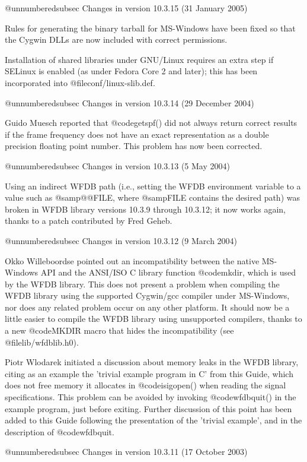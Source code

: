 {{{{{{{{@unnumberedsubsec Changes in version 10.3.15 (31 January 2005)

Rules for generating the binary tarball for MS-Windows have been
fixed so that the Cygwin DLLs are now included with correct
permissions.

Installation of shared libraries under GNU/Linux requires an extra
step if SELinux is enabled (as under Fedora Core 2 and later);  this
has been incorporated into @file{conf/linux-slib.def}.

@unnumberedsubsec Changes in version 10.3.14 (29 December 2004)

Guido Muesch reported that @code{getspf()} did not always
return correct results if the frame frequency does not have an exact
representation as a double precision floating point number.  This problem has
now been corrected.

@unnumberedsubsec Changes in version 10.3.13 (5 May 2004)

Using an indirect WFDB path (i.e., setting the WFDB environment
variable to a value such as @samp{@@FILE}, where @samp{FILE} contains the
desired path) was broken in WFDB library versions 10.3.9 through
10.3.12;  it now works again, thanks to a patch contributed by
Fred Geheb.

@unnumberedsubsec Changes in version 10.3.12 (9 March 2004)

Okko Willeboordse pointed out an incompatibility between the native
MS-Windows API and the ANSI/ISO C library function @code{mkdir}, which is
used by the WFDB library.  This does not present a problem when
compiling the WFDB library using the supported Cygwin/gcc compiler
under MS-Windows, nor does any related problem occur on any other
platform.  It should now be a little easier to compile the WFDB library
using unsupported compilers, thanks to a new @code{MKDIR} macro that hides
the incompatibility (see @file{lib/wfdblib.h0}).

Piotr Wlodarek initiated a discussion about memory leaks in the WFDB
library, citing as an example the 'trivial example program in C' from
this Guide, which does not free memory it allocates in @code{isigopen()}
when reading the signal specifications.  This problem can be avoided by
invoking @code{wfdbquit()} in the example program, just before exiting.
Further discussion of this point has been added to this Guide following
the presentation of the 'trivial example', and in the description of
@code{wfdbquit}.

@unnumberedsubsec Changes in version 10.3.11 (17 October 2003)

}}}}}}}}
